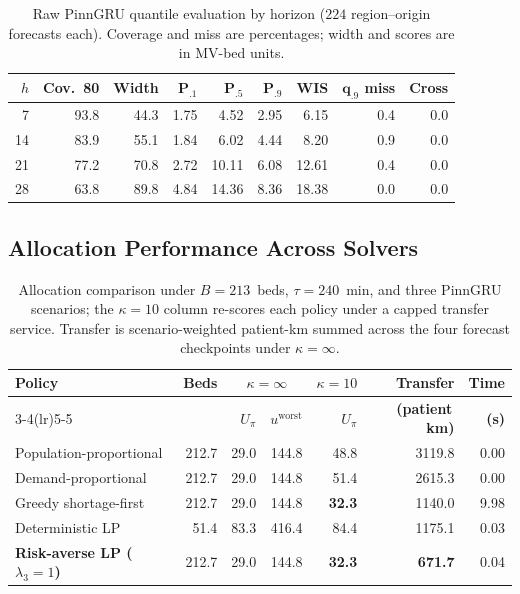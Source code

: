 \begin{table}[t]
\caption{Raw PinnGRU quantile evaluation by horizon ($224$
region--origin forecasts each). Coverage and miss are percentages;
width and scores are in MV-bed units.}
\label{tab:quantile_accuracy}
\centering
\scriptsize
\renewcommand{\arraystretch}{1.0}
\setlength{\tabcolsep}{2.5pt}
\begin{tabular}{rrrrrrrrr}
\toprule
\textbf{$h$} & \textbf{Cov.\ 80} & \textbf{Width}
 & \boldmath$\mathbf{P}_{.1}$ & \boldmath$\mathbf{P}_{.5}$
 & \boldmath$\mathbf{P}_{.9}$ & \textbf{WIS}
 & \boldmath$\mathbf{q}_{.9}$ \textbf{miss} & \textbf{Cross}\\
\midrule
 7 & 93.8 & 44.3 & 1.75 &  4.52 & 2.95 &  6.15 & 0.4 & 0.0\\
14 & 83.9 & 55.1 & 1.84 &  6.02 & 4.44 &  8.20 & 0.9 & 0.0\\
21 & 77.2 & 70.8 & 2.72 & 10.11 & 6.08 & 12.61 & 0.4 & 0.0\\
28 & 63.8 & 89.8 & 4.84 & 14.36 & 8.36 & 18.38 & 0.0 & 0.0\\
\bottomrule
\end{tabular}
\end{table}

\subsection{Allocation Performance Across Solvers}
\label{ssec:e2_e3}

\begin{table}[t]
\caption{Allocation comparison under $B = 213$~beds, $\tau = 240$~min,
and three PinnGRU scenarios; the $\kappa{=}10$ column re-scores each
policy under a capped transfer service. Transfer is scenario-weighted
patient-km summed across the four forecast checkpoints under
$\kappa{=}\infty$.}
\label{tab:allocation}
\centering
\renewcommand{\arraystretch}{1.02}
\setlength{\tabcolsep}{4pt}
\begin{tabular}{lrrrrrr}
\toprule
\textbf{Policy} & \textbf{Beds}
                & \multicolumn{2}{c}{\boldmath$\kappa{=}\infty$}
                & \boldmath$\kappa{=}10$
                & \textbf{Transfer} & \textbf{Time}\\
\cmidrule(lr){3-4}\cmidrule(lr){5-5}
                & & $U_\pi$ & $u^{\mathrm{worst}}$ & $U_\pi$
                & \textbf{(patient\,km)} & \textbf{(s)}\\
\midrule
Population-proportional    & 212.7 & 29.0  & 144.8 & 48.8 & 3119.8  & 0.00 \\
Demand-proportional        & 212.7 & 29.0  & 144.8 & 51.4 & 2615.3  & 0.00 \\
Greedy shortage-first      & 212.7 & 29.0  & 144.8 & \textbf{32.3} & 1140.0  & 9.98 \\
Deterministic LP           &  51.4 & 83.3  & 416.4 & 84.4 & 1175.1  & 0.03 \\
\textbf{Risk-averse LP ($\lambda_3{=}1$)}
                           & 212.7 & 29.0  & 144.8 & \textbf{32.3} & \textbf{671.7} & 0.04 \\
\bottomrule
\end{tabular}
\end{table}

